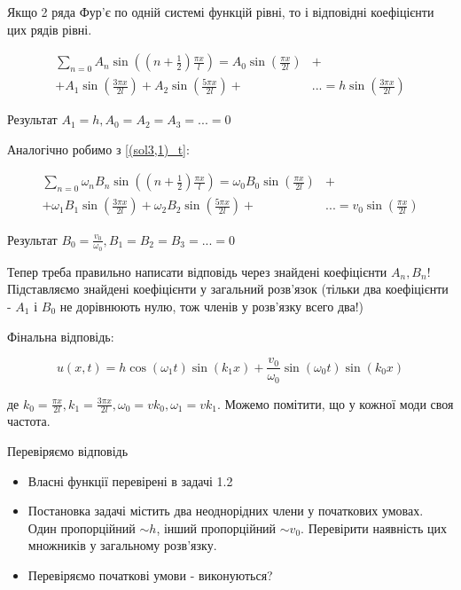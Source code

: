 Якщо 2 ряда Фур'є по одній системі функцій рівні, то і відповідні коефіцієнти цих рядів рівні.

\begin{equation}
    \begin{aligned}
        \sum_{n=0} A_n \sin \left( (n + \frac{1}{2}) \frac{\pi x}{l} \right) = A_0 \sin \left(\frac{\pi x}{2 l} \right) &+\\
        + A_1 \sin \left(\frac{3 \pi x}{2 l} \right) + A_2 \sin \left(\frac{5 \pi x}{2 l} \right) + &... = h \sin \left( \frac{3 \pi x}{2 l} \right)
    \end{aligned}
\end{equation}

Результат $A_1 = h, A_0 = A_2 = A_3 = ... = 0$

Аналогічно робимо з \ref{(sol3,1)_t}: 

\begin{equation}
    \begin{aligned}
        \sum_{n=0} \omega_n B_n \sin \left( (n + \frac{1}{2}) \frac{\pi x}{l} \right) = \omega_0 B_0 \sin \left(\frac{\pi x}{2 l} \right) &+\\
        + \omega_1 B_1 \sin \left(\frac{3 \pi x}{2 l} \right) + \omega_2 B_2 \sin \left(\frac{5 \pi x}{2 l} \right) + &... = v_0 \sin \left( \frac{\pi x}{2 l} \right)
    \end{aligned}
\end{equation}

Результат $B_0 = \frac{v_0}{\omega_0}, B_1 = B_2 = B_3 = ... = 0$

Тепер треба правильно написати відповідь через знайдені коефіцієнти $A_n, B_n$! Підставляємо знайдені коефіцієнти у загальний розв'язок (тільки два коефіцієнти - $A_1$ і $B_0$ не дорівнюють нулю, тож членів у розв'язку всего два!)

Фінальна відповідь:

\begin{equation}
    u (x,t) = h \cos (\omega_1 t) \sin (k_1 x) + \frac{v_0}{\omega_0} \sin (\omega_0 t) \sin (k_0 x)
\end{equation}

де $k_0 = \frac{\pi x}{2 l}, k_1 = \frac{3 \pi x}{2 l}, \omega_0 = v k_0, \omega_1 = v k_1 $. Можемо помітити, що у кожної моди своя частота.

Перевіряємо відповідь

\begin{itemize}
    \item Власні функції перевірені в задачі 1.2
    \item Постановка задачі містить два неоднорідних члени у початкових умовах. Один пропорційний $\sim h$, інший пропорційний $\sim v_0$. Перевірити наявність цих множників у загальному розв'язку.
    \item Перевіряємо початкові умови - виконуються?

\end{itemize}

